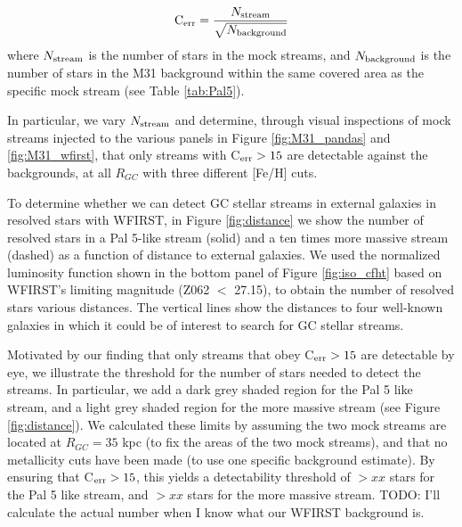 \documentclass[twocolumn]{aastex62}
\newcommand{\todo}[1]{{\color{red} TODO: #1}}
\begin{document}
\begin{equation}
{\rm C}_{\rm err} = \frac{N_{\rm stream}}{\sqrt{N_{\rm background}}}
\end{equation}
where $N_{\rm stream}$ is the number of stars in the mock streams, and $N_{\rm background}$ is the number of stars in the M31 background within the same covered area as the specific mock stream (see Table \ref{tab:Pal5}). 

In particular, we vary $N_{\rm stream}$ and determine, through visual inspections of mock streams injected to the various panels in Figure \ref{fig:M31_pandas} and \ref{fig:M31_wfirst}, that only streams with C$_{\rm err} > 15$ are detectable against the backgrounds, at all $R_{GC}$ with three different [Fe/H] cuts. 

To determine whether we can detect GC stellar streams in external galaxies in resolved stars with WFIRST, in Figure \ref{fig:distance} we show the number of resolved stars in a Pal 5-like stream (solid) and a ten times more massive stream (dashed) as a function of distance to external galaxies. We used the normalized luminosity function shown in the bottom panel of Figure \ref{fig:iso_cfht} based on WFIRST's limiting magnitude (Z062 $<$ 27.15), to obtain the number of resolved stars various distances. The vertical lines show the distances to four well-known galaxies in which it could be of interest to search for GC stellar streams. 

Motivated by our finding that only streams that obey C$_{\rm err} > 15$ are detectable by eye,  we illustrate the threshold for the number of stars needed to detect the streams. In particular, we add a dark grey shaded region for the Pal 5 like stream, and a light grey shaded region for the more massive stream (see Figure \ref{fig:distance}). We  calculated these limits by assuming the two mock streams are located at $R_{GC} = 35$ kpc (to fix the areas of the two mock streams), and that no metallicity cuts have been made (to use one specific background estimate). By ensuring that C$_{\rm err} > 15$, this yields a detectability threshold of $>xx$ stars for the Pal 5 like stream, and $> xx$ stars for the more massive stream. \todo{I'll calculate the actual number when I know what our WFIRST background is}.
\end{document}
